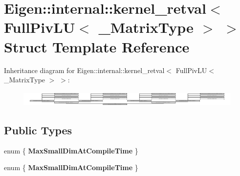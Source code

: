 \hypertarget{struct_eigen_1_1internal_1_1kernel__retval_3_01_full_piv_l_u_3_01___matrix_type_01_4_01_4}{}\section{Eigen\+:\+:internal\+:\+:kernel\+\_\+retval$<$ Full\+Piv\+LU$<$ \+\_\+\+Matrix\+Type $>$ $>$ Struct Template Reference}
\label{struct_eigen_1_1internal_1_1kernel__retval_3_01_full_piv_l_u_3_01___matrix_type_01_4_01_4}
Inheritance diagram for Eigen\+:\+:internal\+:\+:kernel\+\_\+retval$<$ Full\+Piv\+LU$<$ \+\_\+\+Matrix\+Type $>$ $>$\+:\begin{figure}[H]
\begin{center}
\leavevmode
\includegraphics[height=0.811258cm]{struct_eigen_1_1internal_1_1kernel__retval_3_01_full_piv_l_u_3_01___matrix_type_01_4_01_4}
\end{center}
\end{figure}
\subsection*{Public Types}
\begin{DoxyCompactItemize}
\item 
\mbox{\label{struct_eigen_1_1internal_1_1kernel__retval_3_01_full_piv_l_u_3_01___matrix_type_01_4_01_4_a9dd83ad4d88ab6e89559acbfafd817cc}} 
enum \{ {\bfseries Max\+Small\+Dim\+At\+Compile\+Time}
 \}
\item 
\mbox{\label{struct_eigen_1_1internal_1_1kernel__retval_3_01_full_piv_l_u_3_01___matrix_type_01_4_01_4_a3bcbaf7603eedcb3ae0e9c068ea79e50}} 
enum \{ {\bfseries Max\+Small\+Dim\+At\+Compile\+Time}
 \}
\end{DoxyCompactItemize}
